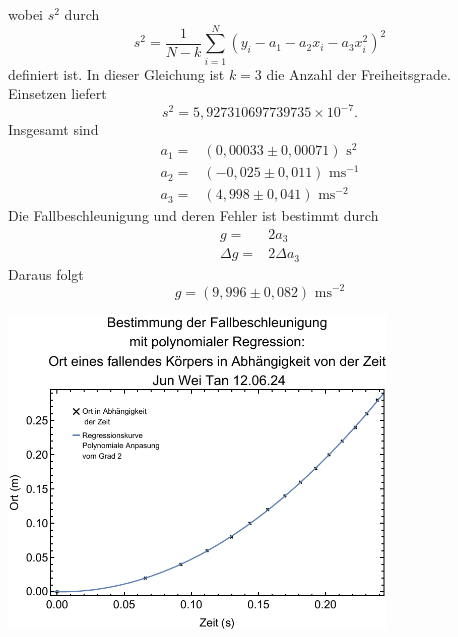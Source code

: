 \documentclass[prb,12pt]{revtex4-2}
\theoremstyle{definition}
\theoremstyle{definition}
\begin{document}
wobei $s^2$ durch
\[s^2=\frac{1}{N-k}\sum_{i=1}^N (y_i-a_1 - a_2 x_i - a_3 x_i^2)^2\]
definiert ist. In dieser Gleichung ist $k=3$ die Anzahl der Freiheitsgrade. Einsetzen liefert
\[s^2=5,927310697739735\times 10^{-7}.\]
Insgesamt sind
\begin{align*}
	a_1=&(0,00033\pm 0,00071)\text{ s}^2\\
	a_2=&(-0,025\pm 0,011)\text{ ms}^{-1}\\
	a_3=&(4,998\pm 0,041)\text{ ms}^{-2}
\end{align*}
Die Fallbeschleunigung und deren Fehler ist bestimmt durch
\begin{align*}
	g=& 2 a_3\\
	\Delta g =& 2\Delta a_3
\end{align*}
Daraus folgt
\[g=(9,996\pm 0,082)\text{ ms}^{-2}\]
\begin{center}
\includegraphics[width=0.75\textwidth]{plt.pdf}
\end{center}
\end{document}
